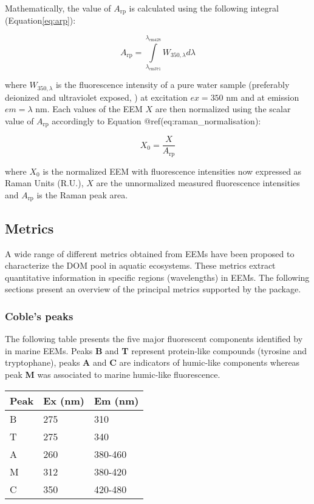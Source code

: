 \documentclass[]{book}
\theoremstyle{definition}
\theoremstyle{definition}
\theoremstyle{remark}
\begin{document}
Mathematically, the value of \(A_{\text{rp}}\) is calculated using the
following integral (Equation\eqref{eq:arp}):

\begin{equation}
A_{\text{rp}} = \int\limits_{\lambda_{\text{em}371}}^{\lambda_{\text{em}428}} W_{350, \lambda} d\lambda
\label{eq:arp}
\end{equation}

where \(W_{350, \lambda}\) is the fluorescence intensity of a pure water
sample (preferably deionized and ultraviolet exposed,
\citet{Lawaetz2009}) at excitation \(ex = 350\) nm and at emission
\(em = \lambda\) nm. Each values of the EEM \(X\) are then normalized
using the scalar value of \(A_{\text{rp}}\) accordingly to Equation
@ref(eq:raman\_normalisation):

\begin{equation}
X_0 = \frac{X}{A_{\text{rp}}}
\label{eq:raman_normalisation}
\end{equation}

where \(X_0\) is the normalized EEM with fluorescence intensities now
expressed as Raman Units (R.U.), \(X\) are the unnormalized measured
fluorescence intensities and \(A_{\text{rp}}\) is the Raman peak area.

\subsection{Metrics}\label{metrics-1}

A wide range of different metrics obtained from EEMs have been proposed
to characterize the DOM pool in aquatic ecosystems. These metrics
extract quantitative information in specific regions (wavelengths) in
EEMs. The following sections present an overview of the principal
metrics supported by the package.

\subsubsection{Coble's peaks}\label{cobles-peaks}

The following table presents the five major fluorescent components
identified by \citep{Coble1996} in marine EEMs. Peaks \textbf{B} and
\textbf{T} represent protein-like compounds (tyrosine and tryptophane),
peaks \textbf{A} and \textbf{C} are indicators of humic-like components
whereas peak \textbf{M} was associated to marine humic-like
fluorescence.

\begin{longtable}[]{@{}lll@{}}
\toprule
Peak & Ex (nm) & Em (nm)\tabularnewline
\midrule
\endhead
B & 275 & 310\tabularnewline
T & 275 & 340\tabularnewline
A & 260 & 380-460\tabularnewline
M & 312 & 380-420\tabularnewline
C & 350 & 420-480\tabularnewline
\bottomrule
\end{longtable}
\end{document}
